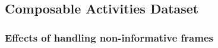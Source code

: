 \subsection{Composable Activities Dataset} \label{subsec:composableActivities}

\subsubsection{Effects of handling non-informative frames}



